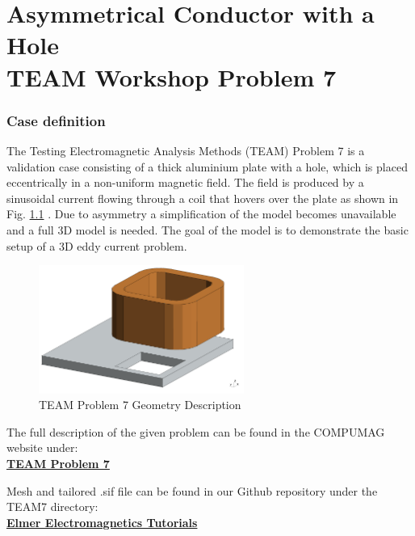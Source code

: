 \chapter{Asymmetrical Conductor with a Hole \\ TEAM Workshop Problem 7}



\subsection*{Case definition}

The Testing Electromagnetic Analysis Methods (TEAM) Problem 7 is a validation case consisting of a thick aluminium plate with a hole,  which is placed eccentrically in a non-uniform magnetic field.  The field is produced by a sinusoidal current flowing through a coil that hovers over the plate as shown in Fig. \ref{fg:geometry} .  Due to asymmetry a simplification of the model becomes unavailable and a full 3D model is needed.   The goal of the model is to demonstrate the basic setup of a 3D eddy current problem.

\begin{figure}[H]
\centering
\includegraphics[width=0.6\textwidth]{figures/TEAM7_geo.png}
\caption{TEAM Problem 7 Geometry Description}\label{fg:geometry}
\end{figure}  

\noindent The full description of the given problem can be found in the COMPUMAG website under: \\
 \href{https://www.compumag.org/wp/wp-content/uploads/2018/06/problem7.pdf}{\textbf{TEAM Problem 7}} 
 
\noindent Mesh and tailored .sif file can be found in our Github repository under the TEAM7 directory: \\
 \href{https://github.com/ElmerCSC/elmer-elmag}{\textbf{Elmer Electromagnetics Tutorials}}  
 
